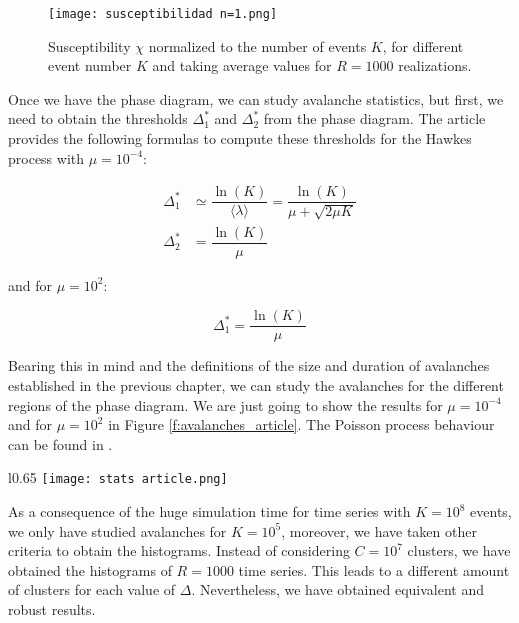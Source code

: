 \begin{figure}[H]
    \centering
    \texttt{[image: susceptibilidad n=1.png]}
    \caption{Susceptibility $\chi$ normalized to the number of events $K$, for different event number $K$ and taking average values for $R=1000$ realizations.}
    \label{f:susceptibilidad_article}   
\end{figure}

Once we have the phase diagram, we can study avalanche statistics, but first, we need to obtain the thresholds $\Delta_1^*$ and $\Delta_2^*$ from the phase diagram. 
The article \cite{notarmuzi2021percolation} provides the following formulas to compute these thresholds for the Hawkes process with $\mu=10^{-4}$:

\begin{align}
    \Delta_1^* &\simeq \dfrac{\ln(K)}{\langle \lambda \rangle}= \dfrac{\ln(K)}{\mu+\sqrt{2\mu K}} \label{eq:Ecuación delta1 *} \\
    \Delta_2^* &= \dfrac{\ln(K)}{\mu}\label{eq:Ecuación delta2 *}
\end{align}

and for $\mu=10^2$:

\begin{equation}
    \Delta_1^* = \dfrac{\ln(K)}{\mu}
\end{equation}

Bearing this in mind and the definitions of the size and duration of avalanches established in the previous chapter, we can study the avalanches for the different regions
of the phase diagram. We are just going to show the results for $\mu=10^{-4}$ and for $\mu=10^2$ in Figure \ref{f:avalanches_article}. The Poisson process behaviour can be found in 
\cite{stauffer2018introduction, stauffer1978critical}. 


\begin{wrapfigure}{l}{0.65\textwidth}
      \texttt{[image: stats article.png]}
    \caption{Avalanche analysis for Hawkes process with $n=1$, $K=10^5$ events. The histograms have been calculated over $R=1000$ time series.}
    \label{f:avalanches_article}
\end{wrapfigure}

As a consequence of the huge simulation time for time series with $K=10^8$ events, we only have studied avalanches for $K=10^5$, moreover, we have taken other criteria to obtain the 
histograms. Instead of considering $C=10^7$ clusters, we have obtained the histograms of $R=1000$ time series. This leads to a different amount of clusters for each value of $\Delta$.
Nevertheless, we have obtained equivalent and robust results.

